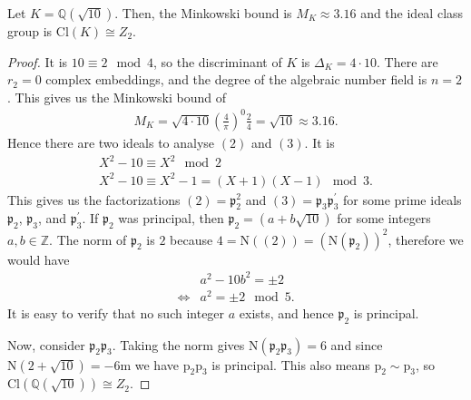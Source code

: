 \begin{exmbox}
    \begin{example}
        Let \(K = \mathbb{Q}(\sqrt{10})\). Then, the Minkowski bound is \(M_K \approx 3.16\) and the ideal class group is \(\mathrm{Cl}(K) \cong Z_2\).
    \end{example}
\end{exmbox}
\begin{proof}
    It is \(10 \equiv 2 \mod{4}\), so the discriminant of \(K\) is \(\Delta_K = 4 \cdot 10\). There are \(r_2 = 0\) complex embeddings, and the degree of the algebraic number field is \(n = 2\). This gives us the Minkowski bound of
    \begin{align*}
        M_K = \sqrt{4 \cdot 10} \left(\frac{4}{\pi}\right)^0 \frac{2}{4} = \sqrt{10} \approx 3.16 \text{.}
    \end{align*}
    Hence there are two ideals to analyse \((2)\) and \((3)\). It is
    \begin{align*}
        X^2 - 10 \equiv X^2 \mod{2} \\
        X^2 - 10 \equiv X^2 - 1 = (X + 1)(X - 1) \mod{3} \text{.}
    \end{align*}
    This gives us the factorizations \((2) = \mathfrak{p}_2^2\) and \((3) = \mathfrak{p}_3 \mathfrak{p}_3^\prime\) for some prime ideals \(\mathfrak{p}_2\), \(\mathfrak{p}_3\), and \(\mathfrak{p}_3^\prime\). If \(\mathfrak{p}_2\) was principal, then \(\mathfrak{p}_2 = (a + b\sqrt{10})\) for some integers \(a, b \in \mathbb{Z}\). The norm of \(\mathfrak{p}_2\) is \(2\) because \(4 = \mathrm{N}((2)) = (\mathrm{N}(\mathfrak{p}_2))^2\), therefore we would have
    \begin{align*}
        & a^2 - 10 b^2 = \pm 2 \\
        \iff & a^2 = \pm 2 \mod{5} \text{.}
    \end{align*}
    It is easy to verify that no such integer \(a\) exists, and hence \(\mathfrak{p}_2\) is principal.

    Now, consider \(\mathfrak{p}_2 \mathfrak{p}_3\). Taking the norm gives \(\mathrm{N}(\mathfrak{p}_2 \mathfrak{p}_3) = 6\) and since \(\mathrm{N}(2 + \sqrt{10}) = -6\)m we have \(\mathrm{p}_2 \mathrm{p}_3\) is principal. This also means \(\mathrm{p}_2 \sim \mathrm{p}_3\), so \(\mathrm{Cl}(\mathbb{Q}(\sqrt{10})) \cong Z_2\).
\end{proof}

